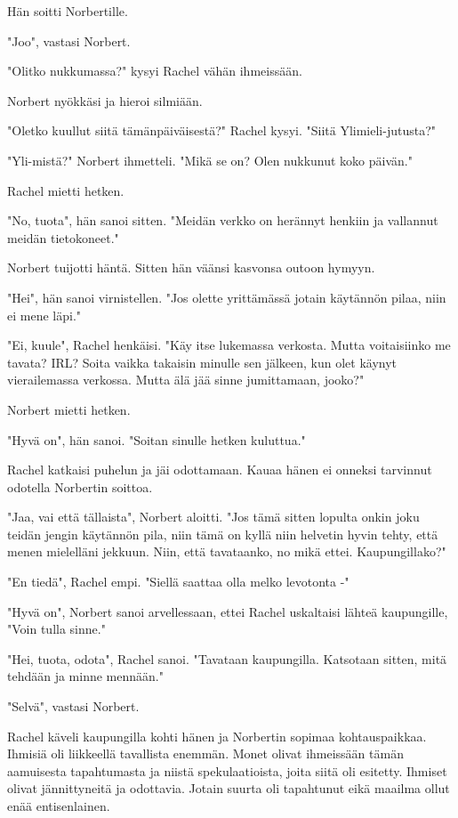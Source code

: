 Hän soitti Norbertille.


"Joo", vastasi Norbert.


"Olitko nukkumassa?" kysyi Rachel vähän ihmeissään.


Norbert nyökkäsi ja hieroi silmiään.


"Oletko kuullut siitä tämänpäiväisestä?" Rachel kysyi. "Siitä Ylimieli-jutusta?"


"Yli-mistä?" Norbert ihmetteli. "Mikä se on? Olen nukkunut koko päivän."


Rachel mietti hetken.


"No, tuota", hän sanoi sitten. "Meidän verkko on herännyt henkiin ja vallannut meidän tietokoneet."


Norbert tuijotti häntä. Sitten hän väänsi kasvonsa outoon hymyyn.


"Hei", hän sanoi virnistellen. "Jos olette yrittämässä jotain käytännön pilaa, niin ei mene läpi."


"Ei, kuule", Rachel henkäisi. "Käy itse lukemassa verkosta. Mutta voitaisiinko me tavata? IRL? Soita vaikka takaisin minulle sen jälkeen, kun olet käynyt vierailemassa verkossa. Mutta älä jää sinne jumittamaan, jooko?"


Norbert mietti hetken.


"Hyvä on", hän sanoi. "Soitan sinulle hetken kuluttua."


Rachel katkaisi puhelun ja jäi odottamaan. Kauaa hänen ei onneksi tarvinnut odotella Norbertin soittoa.


"Jaa, vai että tällaista", Norbert aloitti. "Jos tämä sitten lopulta onkin joku teidän jengin käytännön pila, niin tämä on kyllä niin helvetin hyvin tehty, että menen mielelläni jekkuun. Niin, että tavataanko, no mikä ettei. Kaupungillako?"


"En tiedä", Rachel empi. "Siellä saattaa olla melko levotonta -"


"Hyvä on", Norbert sanoi arvellessaan, ettei Rachel uskaltaisi lähteä kaupungille, "Voin tulla sinne."


"Hei, tuota, odota", Rachel sanoi. "Tavataan kaupungilla. Katsotaan sitten, mitä tehdään ja minne mennään."


"Selvä", vastasi Norbert.




\psep Rachel käveli kaupungilla kohti hänen ja Norbertin sopimaa kohtauspaikkaa. Ihmisiä oli liikkeellä tavallista enemmän. Monet olivat ihmeissään tämän aamuisesta tapahtumasta ja niistä spekulaatioista, joita siitä oli esitetty. Ihmiset olivat jännittyneitä ja odottavia. Jotain suurta oli tapahtunut eikä maailma ollut enää entisenlainen.


